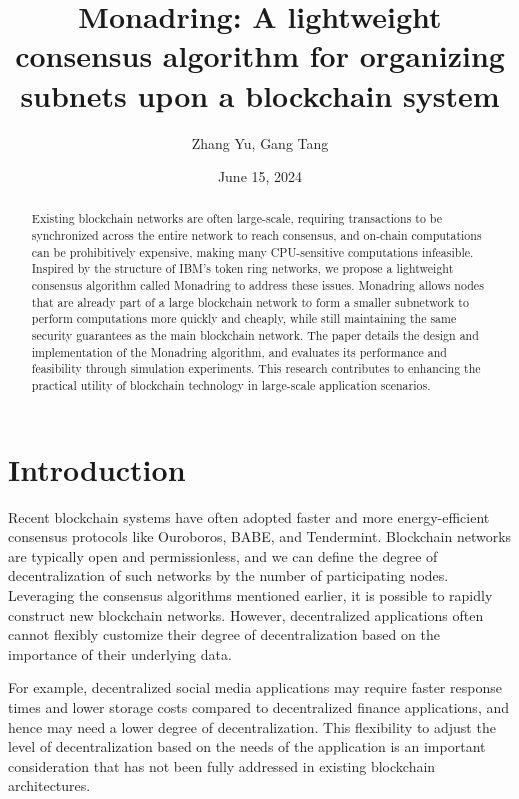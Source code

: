 \documentclass[11pt]{article}
\begin{document}
\title{Monadring: A lightweight consensus algorithm for organizing subnets upon a blockchain system}
\author{Zhang Yu, Gang Tang}
\date{June 15, 2024}
\maketitle

\begin{abstract}
Existing blockchain networks are often large-scale, requiring transactions to be synchronized across the entire network to reach consensus, and on-chain computations can be prohibitively expensive, making many CPU-sensitive computations infeasible. Inspired by the structure of IBM's token ring networks, we propose a lightweight consensus algorithm called Monadring to address these issues. Monadring allows nodes that are already part of a large blockchain network to form a smaller subnetwork to perform computations more quickly and cheaply, while still maintaining the same security guarantees as the main blockchain network. The paper details the design and implementation of the Monadring algorithm, and evaluates its performance and feasibility through simulation experiments. This research contributes to enhancing the practical utility of blockchain technology in large-scale application scenarios.
\end{abstract}

\section{Introduction}

Recent blockchain systems have often adopted faster and more energy-efficient consensus protocols like Ouroboros, BABE, and Tendermint.
Blockchain networks are typically open and permissionless, and we can define the degree of decentralization of such networks by the number of participating nodes.
Leveraging the consensus algorithms mentioned earlier, it is possible to rapidly construct new blockchain networks.
However, decentralized applications often cannot flexibly customize their degree of decentralization based on the importance of their underlying data.

For example, decentralized social media applications may require faster response times and lower storage costs compared to decentralized finance applications, and hence may need a lower degree of decentralization.
This flexibility to adjust the level of decentralization based on the needs of the application is an important consideration that has not been fully addressed in existing blockchain architectures.
\end{document}
